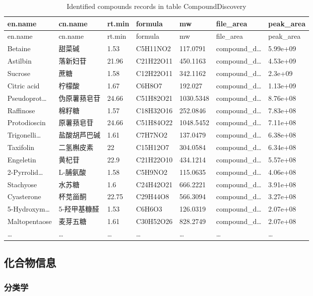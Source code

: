 \documentclass[
]{article}
\begin{document}
\begin{longtable}[]{@{}lllllll@{}}
\caption{\label{tab:Identified-compounds-records-in-table-CompoundDiscovery}Identified compounds records in table CompoundDiscovery}\tabularnewline
\toprule
en.name & cn.name & rt.min & formula & mw & file\_area & peak\_area\tabularnewline
\midrule
\endfirsthead
\toprule
en.name & cn.name & rt.min & formula & mw & file\_area & peak\_area\tabularnewline
\midrule
\endhead
Betaine & 甜菜碱 & 1.53 & C5H11NO2 & 117.0791 & compound\_d\ldots{} & 5.99e+09\tabularnewline
Astilbin & 落新妇苷 & 21.96 & C21H22O11 & 450.1163 & compound\_d\ldots{} & 4.53e+09\tabularnewline
Sucrose & 蔗糖 & 1.58 & C12H22O11 & 342.1162 & compound\_d\ldots{} & 2.3e+09\tabularnewline
Citric acid & 柠檬酸 & 1.67 & C6H8O7 & 192.027 & compound\_d\ldots{} & 1.13e+09\tabularnewline
Pseudoprot\ldots{} & 伪原薯蓣皂苷 & 24.66 & C51H82O21 & 1030.5348 & compound\_d\ldots{} & 8.76e+08\tabularnewline
Raffinose & 棉籽糖 & 1.57 & C18H32O16 & 252.0846 & compound\_d\ldots{} & 7.83e+08\tabularnewline
Protodioscin & 原薯蓣皂苷 & 24.66 & C51H84O22 & 1048.5452 & compound\_d\ldots{} & 7.11e+08\tabularnewline
Trigonelli\ldots{} & 盐酸胡芦巴碱 & 1.61 & C7H7NO2 & 137.0479 & compound\_d\ldots{} & 6.38e+08\tabularnewline
Taxifolin & 二氢槲皮素 & 22 & C15H12O7 & 304.0584 & compound\_d\ldots{} & 6.34e+08\tabularnewline
Engeletin & 黄杞苷 & 22.9 & C21H22O10 & 434.1214 & compound\_d\ldots{} & 5.57e+08\tabularnewline
2-Pyrrolid\ldots{} & L-脯氨酸 & 1.58 & C5H9NO2 & 115.0635 & compound\_d\ldots{} & 4.06e+08\tabularnewline
Stachyose & 水苏糖 & 1.6 & C24H42O21 & 666.2221 & compound\_d\ldots{} & 3.91e+08\tabularnewline
Cyasterone & 杯苋甾酮 & 22.75 & C29H44O8 & 566.3094 & compound\_d\ldots{} & 3.27e+08\tabularnewline
5-Hydroxym\ldots{} & 5-羟甲基糠醛 & 1.53 & C6H6O3 & 126.0319 & compound\_d\ldots{} & 2.07e+08\tabularnewline
Maltopentaose & 麦芽五糖 & 1.61 & C30H52O26 & 828.2749 & compound\_d\ldots{} & 2.07e+08\tabularnewline
\ldots{} & \ldots{} & \ldots{} & \ldots{} & \ldots{} & \ldots{} & \ldots{}\tabularnewline
\bottomrule
\end{longtable}

\hypertarget{ux5316ux5408ux7269ux4fe1ux606f}{%
\subsection{化合物信息}\label{ux5316ux5408ux7269ux4fe1ux606f}}

\hypertarget{ux5206ux7c7bux5b66}{%
\subsubsection{分类学}\label{ux5206ux7c7bux5b66}}
\end{document}
